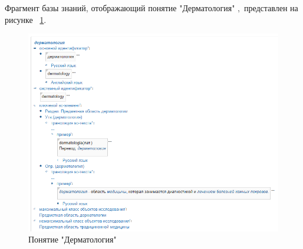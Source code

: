 Фрагмент базы знаний, отображающий понятие "Дерматология" \cite{bme}$,$ представлен на рисунке
~\ref{fig:sections/concept_dermatology}.
\begin{figure}[H]
	\centering
	\includegraphics[width=1.0\textwidth]{sections/concept_dermatology.png}
	\caption{Понятие "Дерматология"}
	\label{fig:sections/concept_dermatology}
\end{figure}

